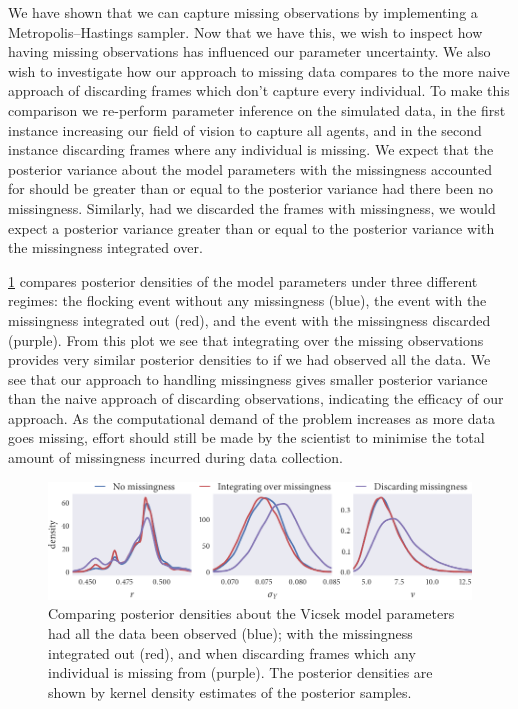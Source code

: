 We have shown that we can capture missing observations by implementing a
Metropolis--Hastings sampler. Now that we have this, we wish to inspect how
having missing observations has influenced our parameter uncertainty. We also
wish to investigate how our approach to missing data compares to the more
naive approach of discarding frames which don't capture every individual. To
make this comparison we re-perform parameter inference on the simulated data,
in the first instance increasing our field of vision to capture all
agents, and in the second instance discarding frames where any individual is
missing. We expect that the posterior variance about the model parameters with
the missingness accounted for should be greater than or equal to the posterior
variance had there been no missingness. Similarly, had we discarded the frames
with missingness, we would expect a posterior variance greater than or equal to
the posterior variance with the missingness integrated over. 

\cref{fig:beg_compare} compares posterior densities of the model parameters
under three different regimes: the flocking event without any missingness
(blue), the event with the missingness integrated out (red), and the event with
the missingness discarded (purple). From this plot we see that integrating over
the missing observations provides very similar posterior densities to if we had
observed all the data. We see that our approach to handling missingness gives
smaller posterior variance than the naive approach of discarding observations,
indicating the efficacy of our approach. As the computational demand of the
problem increases as more data goes missing, effort should still be made by the
scientist to minimise the total amount of missingness incurred during data
collection.

\begin{figure}[tbp]
  \includegraphics{beg/compare_params.pdf}
  \caption{Comparing posterior densities about the Vicsek model parameters had
    all the data been observed (blue); with the missingness integrated out
    (red), and when discarding frames which any individual is missing from
    (purple). The posterior densities are shown by kernel density estimates
    of the posterior samples.}
  \label{fig:beg_compare}
\end{figure}

